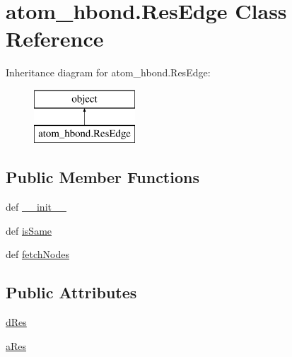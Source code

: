 \hypertarget{classatom__hbond_1_1_res_edge}{\section{atom\-\_\-hbond.\-Res\-Edge Class Reference}
\label{classatom__hbond_1_1_res_edge}
}
Inheritance diagram for atom\-\_\-hbond.\-Res\-Edge\-:\begin{figure}[H]
\begin{center}
\leavevmode
\includegraphics[height=2.000000cm]{classatom__hbond_1_1_res_edge}
\end{center}
\end{figure}
\subsection*{Public Member Functions}
\begin{DoxyCompactItemize}
\item 
def \hyperlink{classatom__hbond_1_1_res_edge_af51fd9b27e369996d2065be38e030d80}{\-\_\-\-\_\-init\-\_\-\-\_\-}
\item 
def \hyperlink{classatom__hbond_1_1_res_edge_a1b1879d61c691b05147b85a6da7b81f5}{is\-Same}
\item 
def \hyperlink{classatom__hbond_1_1_res_edge_a30c356fff77b43a187c8e0143e41c0e3}{fetch\-Nodes}
\end{DoxyCompactItemize}
\subsection*{Public Attributes}
\begin{DoxyCompactItemize}
\item 
\hyperlink{classatom__hbond_1_1_res_edge_a5a7542d9deea5ec7f8cab053e197439e}{d\-Res}
\item 
\hyperlink{classatom__hbond_1_1_res_edge_a6ba4a08bcf8e7c4f4f7ce68fd89502df}{a\-Res}
\end{DoxyCompactItemize}


